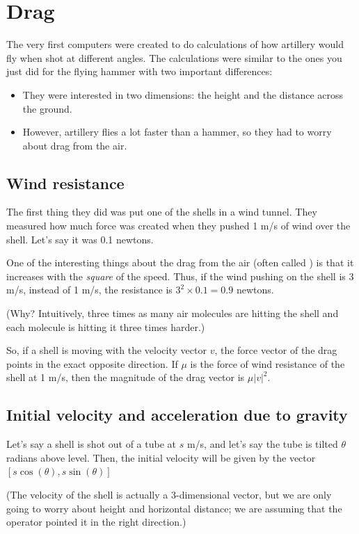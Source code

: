 \chapter{Drag}

The very first computers were created to do calculations of how
artillery would fly when shot at different angles. The calculations
were similar to the ones you just did for the flying
hammer with two important differences:
\begin{itemize}
\item They were interested in two dimensions: the height and the distance across the ground.
\item However, artillery flies a lot faster than a hammer, so they had to worry about drag from the air.
\end{itemize}

\section{Wind resistance}

The first thing they did was put one of the shells in a wind tunnel.
They measured how much force was created when they pushed 1 m/s of
wind over the shell. Let's say it was 0.1 newtons.

One of the interesting things about the drag from the air (often
called ) is that it increases with the
\emph{square} of the speed. Thus, if the wind pushing on the shell is
3 m/s, instead of 1 m/s, the resistance is $3^2 \times 0.1 = 0.9$
newtons.

(Why? Intuitively, three times as many air molecules are hitting the
shell and each molecule is hitting it three times harder.)

So, if a shell is moving with the velocity vector $v$, the force
vector of the drag points in the exact opposite direction. If $\mu$ is
the force of wind resistance of the shell at 1 m/s, then the magnitude
of the drag vector is $\mu |v|^2$.

\section{Initial velocity and acceleration due to gravity}

Let's say a shell is shot out of a tube at $s$ m/s, and let's say the tube
is tilted $\theta$ radians above level.  Then, the initial velocity
will be given by the vector $[s \cos(\theta), s \sin(\theta)]$

(The velocity of the shell is actually a 3-dimensional vector, but we
are only going to worry about height and horizontal distance; we are
assuming that the operator pointed it in the right direction.)

